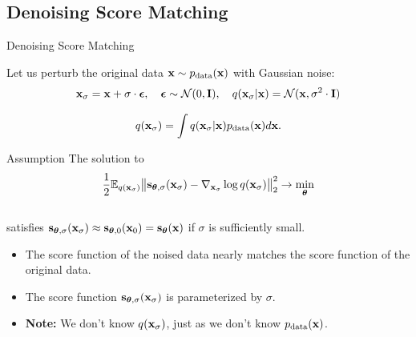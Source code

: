 \documentclass{beamer}
\renewcommand{\eqpause}{}
\begin{document}
\subsection{Denoising Score Matching}
\begin{frame}{Denoising Score Matching}

	Let us perturb the original data $\mathbf{x} \sim p_{\text{data}}(\mathbf{x})$ with Gaussian noise:
	\vspace{-0.3cm}
	\[
		\mathbf{x}_{\sigma} = \mathbf{x} + \sigma \cdot \boldsymbol{\epsilon}, \quad \boldsymbol{\epsilon} \sim \mathcal{N}(0, \mathbf{I}), \quad q(\mathbf{x}_{\sigma} | \mathbf{x}) = \mathcal{N}(\mathbf{x}, \sigma^2 \cdot \mathbf{I})
	\]
	\eqpause
	\vspace{-0.4cm}
	\[
		q(\mathbf{x}_{\sigma}) = \int q(\mathbf{x}_{\sigma} | \mathbf{x}) p_{\text{data}}(\mathbf{x}) d\mathbf{x}.
	\]
	\eqpause
	\vspace{-0.5cm}
	\begin{block}{Assumption}
		The solution to
		\[
			\frac{1}{2} \mathbb{E}_{q(\mathbf{x}_{\sigma})}\big\| \mathbf{s}_{\boldsymbol{\theta}, \sigma}(\mathbf{x}_{\sigma}) - \nabla_{\mathbf{x}_{\sigma}} \log q(\mathbf{x}_{\sigma}) \big\|^2_2 \rightarrow \min_{\boldsymbol{\theta}}
		\]
		\vspace{-0.3cm} \\
		satisfies $\mathbf{s}_{\boldsymbol{\theta}, \sigma}(\mathbf{x}_{\sigma}) \approx \mathbf{s}_{\boldsymbol{\theta}, 0}(\mathbf{x}_0) = \mathbf{s}_{\boldsymbol{\theta}}(\mathbf{x})$ if $\sigma$ is sufficiently small.
	\end{block}
	\eqpause
	\begin{itemize}
		\item The score function of the noised data nearly matches the score function of the original data.
		\item The score function $\mathbf{s}_{\boldsymbol{\theta}, \sigma}(\mathbf{x}_{\sigma})$ is parameterized by $\sigma$.
		\item \textbf{Note:} We don't know $q(\mathbf{x}_{\sigma})$, just as we don't know $p_{\text{data}}(\mathbf{x})$.
	\end{itemize}
\end{frame}
\end{document}
